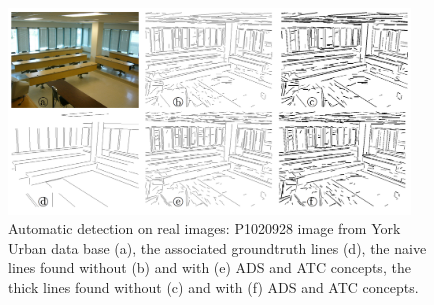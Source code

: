 \documentclass[11pt]{article}
\begin{document}
\begin{figure}
  \begin{center}
  \includegraphics[width=0.95\textwidth]{Images/expe0.png}
  \end{center}
  \caption{Automatic detection on real images: P1020928 image from
    York Urban data base \cite{Denis08} (a), the associated groundtruth lines
    (d), the naive lines found without (b) and with (e) ADS and ATC
    concepts, the thick lines found without (c) and with (f) ADS and
    ATC concepts.}
\end{figure}
\end{document}
